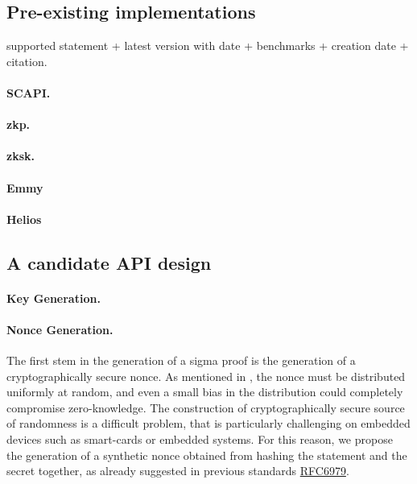 \documentclass[runningheads]{llncs}
\begin{document}
\subsection{Pre-existing implementations}

supported statement + latest version with date + benchmarks + creation date + citation.
\paragraph{SCAPI.}
\paragraph{zkp.}
\paragraph{zksk.}
\paragraph{Emmy}
\paragraph{Helios}
\subsection{A candidate API design}

\paragraph{Key Generation.}

\paragraph{Nonce Generation.} The first stem in the generation of a sigma proof is the generation of a cryptographically secure nonce. As mentioned in , the nonce must be distributed uniformly at random, and even a small bias in the distribution could completely compromise zero-knowledge.
The construction of cryptographically secure source of randomness is a difficult problem, that is particularly challenging on embedded devices such as smart-cards or embedded systems.
For this reason, we propose the generation of a synthetic nonce obtained from hashing the statement and the secret together, as already suggested in previous standards \href{https://tools.ietf.org/html/rfc6979}{RFC6979}.
\end{document}
